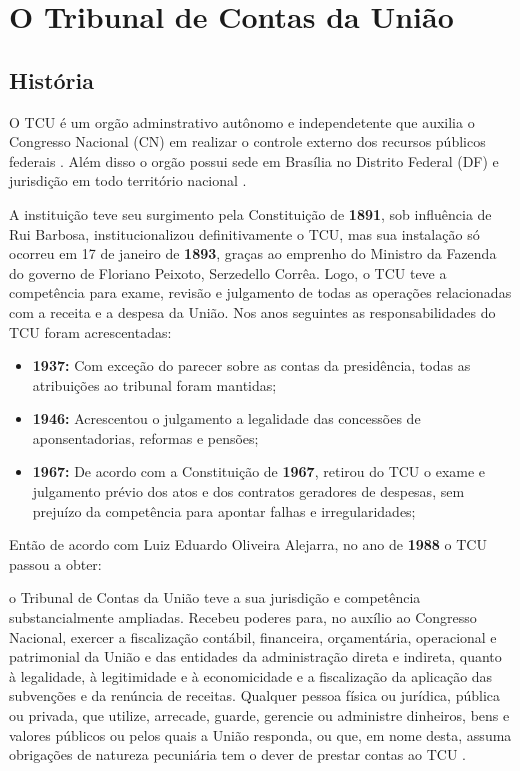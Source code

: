 \chapter[O Tribunal de Contas da União]{O Tribunal de Contas da União}

\section{História}
O TCU é um orgão adminstrativo autônomo e independetente que auxilia o Congresso Nacional (CN) em realizar o controle externo dos recursos públicos federais \cite{TCUHistoria}. Além disso o orgão possui sede em Brasília no Distrito Federal (DF) e jurisdição em todo território nacional \cite{Art73}. 

A instituição teve seu surgimento pela Constituição de \textbf{1891}, sob influência de Rui Barbosa, institucionalizou definitivamente o TCU, mas sua instalação só ocorreu em 17 de janeiro de \textbf{1893}, graças ao emprenho do Ministro da Fazenda do governo de Floriano Peixoto, Serzedello Corrêa\cite{TCUHistoriaJUS}. Logo, o TCU teve a competência para exame, revisão e julgamento de todas as operações relacionadas com a receita e a despesa da União. Nos anos seguintes as responsabilidades do TCU foram acrescentadas\cite{TCUHistoriaJUS}:

\begin{itemize}
	\item \textbf{1937:} Com exceção do parecer sobre as contas da presidência, todas as atribuições ao tribunal foram mantidas;
	
	\item \textbf{1946:} Acrescentou o julgamento a legalidade das concessões de aponsentadorias, reformas e pensões;
	
	\item \textbf{1967:} De acordo com a Constituição de \textbf{1967}, retirou do TCU o exame e julgamento prévio dos atos e dos contratos geradores de despesas, sem prejuízo da competência para apontar falhas e irregularidades; 
\end{itemize}

Então de acordo com Luiz Eduardo Oliveira Alejarra, no ano de \textbf{1988} o TCU passou a obter: 

\begin{citacao}
	o Tribunal de Contas da União teve a sua jurisdição e competência substancialmente ampliadas. Recebeu poderes para, no auxílio ao Congresso Nacional, exercer a fiscalização contábil, financeira, orçamentária, operacional e patrimonial da União e das entidades da administração direta e indireta, quanto à legalidade, à legitimidade e à economicidade e a fiscalização da aplicação das subvenções e da renúncia de receitas. Qualquer pessoa física ou jurídica, pública ou privada, que utilize, arrecade, guarde, gerencie ou administre dinheiros, bens e valores públicos ou pelos quais a União responda, ou que, em nome desta, assuma obrigações de natureza pecuniária tem o dever de prestar contas ao TCU \cite[p. 1]{TCUHistoriaJUS}.
\end{citacao}

